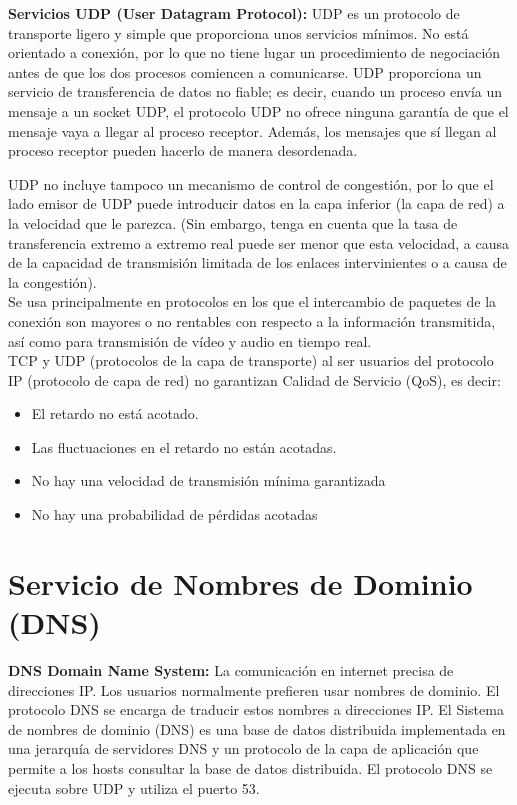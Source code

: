 \documentclass[a4paper,11pt]{article}
\begin{document}
\textbf{Servicios UDP (User Datagram Protocol):} UDP es un protocolo de transporte ligero y simple que proporciona unos servicios mínimos. No está orientado a conexión, por lo que no tiene lugar un procedimiento de negociación antes de que los dos procesos comiencen a comunicarse. UDP proporciona un servicio de transferencia de datos no fiable; es decir, cuando un proceso envía un mensaje a un socket UDP, el protocolo UDP no ofrece ninguna garantía de que el mensaje vaya a llegar al proceso receptor. Además, los mensajes que sí llegan al proceso receptor pueden hacerlo de manera desordenada. 

UDP no incluye tampoco un mecanismo de control de congestión, por lo que el lado emisor de UDP puede introducir datos en la capa inferior (la capa de red) a la velocidad que le parezca. (Sin embargo, tenga en cuenta que la tasa de transferencia extremo a extremo real puede ser menor que esta velocidad, a causa de la capacidad de transmisión limitada de los enlaces intervinientes o a causa de la congestión). \\

Se usa principalmente en protocolos en los que el intercambio de paquetes de la conexión son mayores o no rentables con respecto a la información transmitida, así como para transmisión de vídeo y audio en tiempo real. \\

TCP y UDP (protocolos de la capa de transporte) al ser usuarios del protocolo IP (protocolo de capa de red) no garantizan Calidad de Servicio (QoS), es decir:

\begin{itemize}
\item El retardo no está acotado.
\item Las fluctuaciones en el retardo no están acotadas.
\item No hay una velocidad de transmisión mínima garantizada
\item No hay una probabilidad de pérdidas acotadas
\end{itemize}

\section{Servicio de Nombres de Dominio (DNS)}
\textbf{DNS Domain Name System:} La comunicación en internet precisa de direcciones IP. Los usuarios normalmente prefieren usar nombres de dominio. El protocolo DNS se encarga de traducir estos nombres a direcciones IP. El Sistema de nombres de dominio (DNS) es una base de datos distribuida implementada en una jerarquía de servidores DNS y un protocolo de la capa de aplicación que permite a los hosts consultar la base de datos distribuida. El protocolo DNS se ejecuta sobre UDP y utiliza el puerto 53.\\
\end{document}
